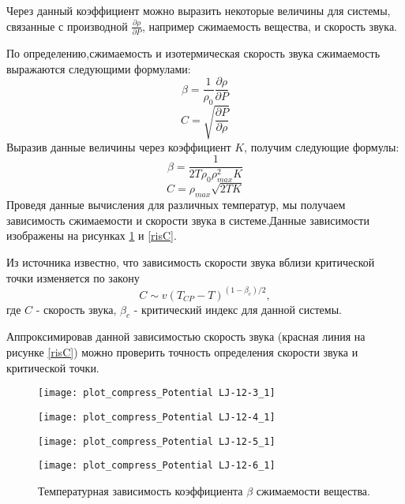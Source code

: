 Через данный коэффициент можно выразить некоторые величины для системы, связанные с производной $\frac{\partial \rho}{\partial P}$, например сжимаемость вещества, и скорость звука.

По определению,сжимаемость и изотермическая скорость звука сжимаемость выражаются следующими формулами:
\begin{equation}
\beta = \frac{1}{\rho_0} \frac{\partial \rho}{\partial P}
\label{eqBetaClassic}
\end{equation}
\begin{equation}
C = \sqrt{\frac{\partial P}{\partial \rho}}
\label{eqCClassic}
\end{equation}
Выразив данные величины через коэффициент $K$, получим следующие формулы:
\begin{equation}
\beta = \frac{1}{2T\rho_0\rho_{max}^2K}
\label{eqBeta}
\end{equation}
\begin{equation}
C = \rho_{max}\sqrt{2TK}
\label{eqC}
\end{equation}
Проведя данные вычисления для различных температур, мы получаем зависимость сжимаемости и скорости звука в системе.Данные зависимости изображены на рисунках \ref{risBeta} и \ref{risC}.

Из источника \cite{soundSpeed} известно, что зависимость скорости звука вблизи критической точки изменяется по закону
\begin{equation}
    C \sim v(T_{CP} - T)^{(1-\beta_c)/2},
    \label{eqFitC}
\end{equation}
где $C$ - скорость звука, $\beta_c$ - критический индекс для данной системы.

Аппроксимировав данной зависимостью скорость звука (красная линия на рисунке \ref{risC}) можно проверить точность определения скорости звука и критической точки.

\begin{figure}[h]
\begin{center}
\begin{minipage}[h]{0.45\linewidth}
\texttt{[image: plot\_compress\_Potential LJ-12-3\_1]}
\end{minipage}
\begin{minipage}[h]{0.45\linewidth}
\texttt{[image: plot\_compress\_Potential LJ-12-4\_1]}
\end{minipage}


\begin{minipage}[h]{0.45\linewidth}
\texttt{[image: plot\_compress\_Potential LJ-12-5\_1]}
\end{minipage}
\begin{minipage}[h]{0.45\linewidth}
\texttt{[image: plot\_compress\_Potential LJ-12-6\_1]}
\end{minipage}
\caption{Температурная зависимость коэффициента $\beta$ сжимаемости вещества.}
\label{risBeta}
\end{center}
\end{figure}


